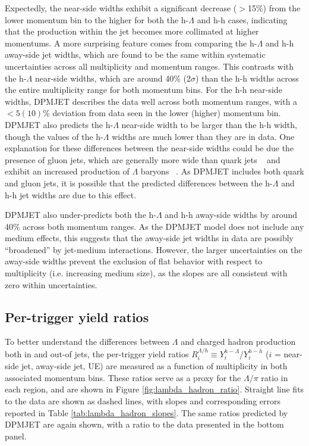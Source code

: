 Expectedly, the near-side widths exhibit a significant decrease ($>$15\%) from the lower momentum bin to the higher for both the h-$\Lambda$ and h-h cases, indicating that the production within the jet becomes more collimated at higher momentums. A more surprising feature comes from comparing the h-$\Lambda$ and h-h away-side jet widths, which are found to be the same within systematic uncertainties across all multiplicity and momentum ranges. This contrasts with the h-$\Lambda$ near-side widths, which are around 40\% ($2\sigma$) than the h-h widths across the entire multiplicity range for both momentum bins. For the h-h near-side widths, DPMJET describes the data well across both momentum ranges, with a $<5 (10)$\%  deviation from data seen in the lower (higher) momentum bin. DPMJET also predicts the h-$\Lambda$ near-side width to be larger than the h-h width, though the values of the h-$\Lambda$ widths are much lower than they are in data. One explanation for these differences between the near-side widths could be due the presence of gluon jets, which are generally more wide than quark jets ~\cite{GluonJet1} and exhibit an increased production of $\Lambda$ baryons ~\cite{GluonJet2}. As DPMJET includes both quark and gluon jets, it is possible that the predicted differences between the h-$\Lambda$ and h-h jet widths are due to this effect. 

DPMJET also under-predicts both the h-$\Lambda$ and h-h away-side widths by around 40\% across both momentum ranges. As the DPMJET model does not include any medium effects, this suggests that the away-side jet widths in data are possibly ``broadened'' by jet-medium interactions. However, the larger uncertainties on the away-side widths prevent the exclusion of flat behavior with respect to multiplicity (i.e. increasing medium size), as the slopes are all consistent with zero within uncertainties.





\subsection{Per-trigger yield ratios}

To better understand the differences between $\Lambda$ and charged hadron production both in and out-of jets, the per-trigger yield ratios $R_{i}^{\Lambda/h} \equiv Y_{i}^{h-\Lambda}$/$Y_{i}^{h-h}$ ($i$ = near-side jet, away-side jet, UE) are measured as a function of multiplicity in both associated momentum bins. These ratios serve as a proxy for the $\Lambda/\pi$ ratio in each region, and are shown in Figure \ref{fig:lambda_hadron_ratio}. Straight line fits to the data are shown as dashed lines, with slopes and corresponding errors reported in Table \ref{tab:lambda_hadron_slopes}. The same ratios predicted by DPMJET are again shown, with a ratio to the data presented in the bottom panel. 

